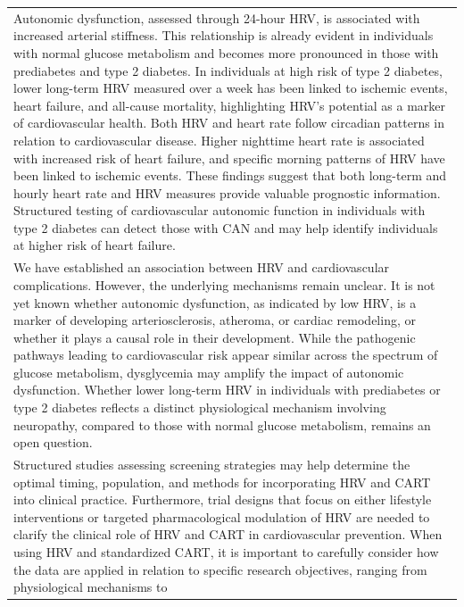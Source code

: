 \documentclass[
  a4paper,
  headsepline=true,
  open=any]{scrbook}
\begin{document}
\begin{longtable}[]{@{}
  >{\raggedright\arraybackslash}p{}@{}}
\toprule\noalign{}
\endhead
\bottomrule\noalign{}
\endlastfoot
Autonomic dysfunction, assessed through 24-hour HRV, is associated with
increased arterial stiffness. This relationship is already evident in
individuals with normal glucose metabolism and becomes more pronounced
in those with prediabetes and type 2 diabetes. In individuals at high
risk of type 2 diabetes, lower long-term HRV measured over a week has
been linked to ischemic events, heart failure, and all-cause mortality,
highlighting HRV's potential as a marker of cardiovascular health. Both
HRV and heart rate follow circadian patterns in relation to
cardiovascular disease. Higher nighttime heart rate is associated with
increased risk of heart failure, and specific morning patterns of HRV
have been linked to ischemic events. These findings suggest that both
long-term and hourly heart rate and HRV measures provide valuable
prognostic information. Structured testing of cardiovascular autonomic
function in individuals with type 2 diabetes can detect those with CAN
and may help identify individuals at higher risk of heart failure. \\
We have established an association between HRV and cardiovascular
complications. However, the underlying mechanisms remain unclear. It is
not yet known whether autonomic dysfunction, as indicated by low HRV, is
a marker of developing arteriosclerosis, atheroma, or cardiac
remodeling, or whether it plays a causal role in their development.
While the pathogenic pathways leading to cardiovascular risk appear
similar across the spectrum of glucose metabolism, dysglycemia may
amplify the impact of autonomic dysfunction. Whether lower long-term HRV
in individuals with prediabetes or type 2 diabetes reflects a distinct
physiological mechanism involving neuropathy, compared to those with
normal glucose metabolism, remains an open question. \\
Structured studies assessing screening strategies may help determine the
optimal timing, population, and methods for incorporating HRV and CART
into clinical practice. Furthermore, trial designs that focus on either
lifestyle interventions or targeted pharmacological modulation of HRV
are needed to clarify the clinical role of HRV and CART in
cardiovascular prevention. When using HRV and standardized CART, it is
important to carefully consider how the data are applied in relation to
specific research objectives, ranging from physiological mechanisms to

\end{longtable}
\end{document}
